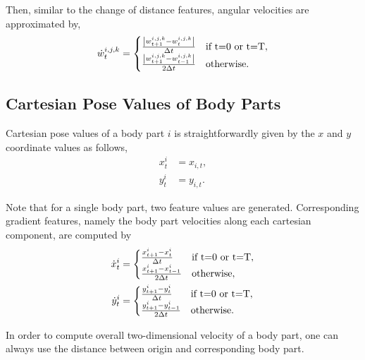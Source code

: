 Then, similar to the change of distance features, angular velocities are approximated by,
\begin{equation}
	\dot{w}^{i,j,k}_t = \begin{cases} \frac{\abs{w^{i,j,k}_{t+1} - w^{i,j,k}_{t}}}{\Delta t} & \textnormal{if } $t=0$ \textnormal{ or } $t=T$, \\ \frac{\abs{w^{i,j,k}_{t+1} - w^{i,j,k}_{t-1}}}{2\Delta t} & \textnormal{otherwise}. \end{cases}
\end{equation}

\subsection{Cartesian Pose Values of Body Parts}
Cartesian pose values of a body part $i$ is straightforwardly given by the $x$ and $y$ coordinate values as follows,
\begin{align}
	x^{i}_t & = x_{i,t}, \\
	y^{i}_t & = y_{i,t}.
\end{align}

Note that for a single body part, two feature values are generated.
Corresponding gradient features, namely the body part velocities along each cartesian component, are computed by
\begin{align}
	\dot{x}^{i}_t & = \begin{cases} \frac{x^{i}_{t+1} - x^{i}_{t}}{\Delta t} & \textnormal{if } $t=0$ \textnormal{ or } $t=T$, \\ \frac{x^{i}_{t+1} - x^{i}_{t-1}}{2\Delta t} & \textnormal{otherwise}, \end{cases} \\
	\dot{y}^{i}_t & = \begin{cases} \frac{y^{i}_{t+1} - y^{i}_{t}}{\Delta t} & \textnormal{if } $t=0$ \textnormal{ or } $t=T$, \\ \frac{y^{i}_{t+1} - y^{i}_{t-1}}{2\Delta t} & \textnormal{otherwise}. \end{cases}
\end{align}

In order to compute overall two-dimensional velocity of a body part, one can always use the distance between origin and corresponding body part.

